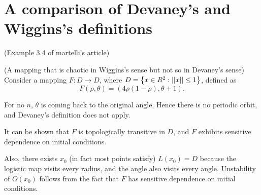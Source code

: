 \documentclass[11pt]{book}
\begin{document}
\section{A comparison of Devaney's and Wiggins's definitions}
(Example 3.4 of martelli's article)
\begin{proposition}
  (A mapping that is chaotic in Wiggins's sense but not so in Devaney's sense)
  Consider a mapping $F: D \to D$, where $D = \left \{ x \in R^2: \left|\left| x \right|\right| \leq 1 \right \}$, defined as
  \begin{equation*}
    F(\rho, \theta) = (4\rho(1 - \rho), \theta + 1).
  \end{equation*}
\end{proposition}
For no $n$, $\theta$ is coming back to the original angle. 
Hence there is no periodic orbit, and Devaney's definition does not apply.

It can be shown that $F$ is topologically transitive in $D$, and $F$ exhibits sensitive dependence on initial conditions.

Also, there exists $x_0$ (in fact most points satisfy) $L(x_0) = D$
because the logistic map visits every radius, and the angle also visits every angle.
Unstability of $O(x_0)$ follows from the fact that $F$ has sensitive dependence on initial conditions.
 



\end{document}
